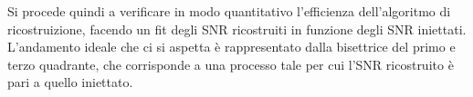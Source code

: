 Si procede quindi a verificare in modo quantitativo l'efficienza dell'algoritmo di ricostruizione, facendo un fit degli SNR ricostruiti in funzione degli SNR iniettati. L'andamento ideale che ci si aspetta è rappresentato dalla bisettrice del primo e terzo quadrante, che corrisponde a una processo tale per cui l'SNR ricostruito è pari a quello iniettato.
